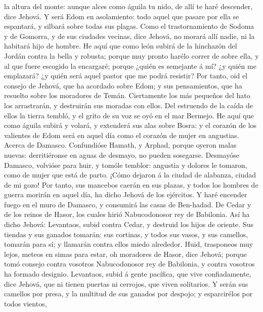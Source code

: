 la altura del monte: aunque alces como águila tu nido, de allí te haré
descender, dice Jehová.  Y será Edom en asolamiento: todo
aquel que pasare por ella se espantará, y silbará sobre todas sus
plagas.  Como el trastornamiento de Sodoma y de Gomorra,
y de sus ciudades vecinas, dice Jehová, no morará allí nadie, ni la
habitará hijo de hombre.  He aquí que como león subirá de
la hinchazón del Jordán contra la bella y robusta; porque muy pronto
harélo correr de sobre ella, y al que fuere escogido la encargaré;
porque ¿quién es semejante á mí? ¿y quién me emplazará? ¿y quién será
aquel pastor que me podrá resistir?  Por tanto, oid el
consejo de Jehová, que ha acordado sobre Edom; y sus pensamientos, que
ha resuelto sobre los moradores de Temán. Ciertamente los más pequeños
del hato los arrastrarán, y destruirán sus moradas con ellos.
 Del estruendo de la caída de ellos la tierra tembló, y
el grito de su voz se oyó en el mar Bermejo.  He aquí que
como águila subirá y volará, y extenderá sus alas sobre Bosra: y el
corazón de los valientes de Edom será en aquel día como el corazón de
mujer en angustias.  Acerca de Damasco. Confundióse
Hamath, y Arphad, porque oyeron malas nuevas: derritiéronse en aguas de
desmayo, no pueden sosegarse.  Desmayóse Damasco,
volvióse para huir, y tomóle temblor: angustia y dolores le tomaron,
como de mujer que está de parto.  ¡Cómo dejaron á la
ciudad de alabanza, ciudad de mi gozo!  Por tanto, sus
mancebos caerán en sus plazas, y todos los hombres de guerra morirán en
aquel día, ha dicho Jehová de los ejércitos.  Y haré
encender fuego en el muro de Damasco, y consumirá las casas de
Ben-hadad.  De Cedar y de los reinos de Hasor, los cuales
hirió Nabucodonosor rey de Babilonia. Así ha dicho Jehová: Levantaos,
subid contra Cedar, y destruid los hijos de oriente.  Sus
tiendas y sus ganados tomarán: sus cortinas, y todos sus vasos, y sus
camellos, tomarán para sí; y llamarán contra ellos miedo alrededor.
 Huid, trasponeos muy lejos, meteos en simas para estar,
oh moradores de Hasor, dice Jehová; porque tomó consejo contra vosotros
Nabucodonosor rey de Babilonia, y contra vosotros ha formado designio.
 Levantaos, subid á gente pacífica, que vive
confiadamente, dice Jehová, que ni tienen puertas ni cerrojos, que viven
solitarios.  Y serán sus camellos por presa, y la
multitud de sus ganados por despojo; y esparcirélos por todos vientos,
